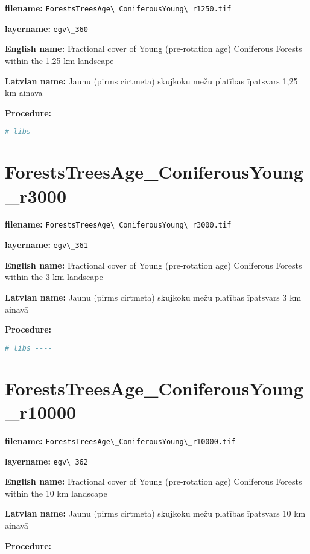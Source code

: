 \documentclass[
]{book}
\newcommand{\passthrough}[1]{#1}
\begin{document}
\textbf{filename:} \passthrough{\lstinline!ForestsTreesAge\_ConiferousYoung\_r1250.tif!}

\textbf{layername:} \passthrough{\lstinline!egv\_360!}

\textbf{English name:} Fractional cover of Young (pre-rotation age) Coniferous Forests within the 1.25 km landscape

\textbf{Latvian name:} Jaunu (pirms cirtmeta) skujkoku mežu platības īpatsvars 1,25 km ainavā

\textbf{Procedure:}

\begin{lstlisting}[language=R]
# libs ----
\end{lstlisting}

\section{ForestsTreesAge\_ConiferousYoung\_r3000}\label{ch06.361}

\textbf{filename:} \passthrough{\lstinline!ForestsTreesAge\_ConiferousYoung\_r3000.tif!}

\textbf{layername:} \passthrough{\lstinline!egv\_361!}

\textbf{English name:} Fractional cover of Young (pre-rotation age) Coniferous Forests within the 3 km landscape

\textbf{Latvian name:} Jaunu (pirms cirtmeta) skujkoku mežu platības īpatsvars 3 km ainavā

\textbf{Procedure:}

\begin{lstlisting}[language=R]
# libs ----
\end{lstlisting}

\section{ForestsTreesAge\_ConiferousYoung\_r10000}\label{ch06.362}

\textbf{filename:} \passthrough{\lstinline!ForestsTreesAge\_ConiferousYoung\_r10000.tif!}

\textbf{layername:} \passthrough{\lstinline!egv\_362!}

\textbf{English name:} Fractional cover of Young (pre-rotation age) Coniferous Forests within the 10 km landscape

\textbf{Latvian name:} Jaunu (pirms cirtmeta) skujkoku mežu platības īpatsvars 10 km ainavā

\textbf{Procedure:}
\end{document}
